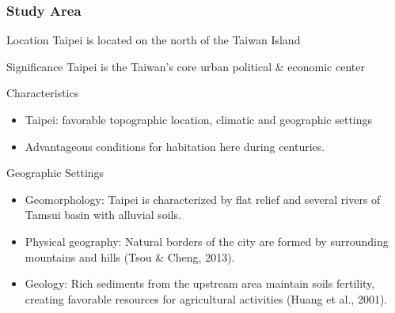 \documentclass[pdflatex,compress,8pt,
	xcolor={dvipsnames,dvipsnames,svgnames,x11names,table},
	hyperref={colorlinks = true,breaklinks = true, urlcolor = NavyBlue, breaklinks = true}]{beamer}
\begin{document}
\begin{frame}\frametitle{Study Area}
	\begin{alertblock}{Location}
Taipei is located on the north of the Taiwan Island
	\end{alertblock}
	
	\begin{block}{Significance}
Taipei is the Taiwan's core urban political \& economic center
	\end{block}

	\begin{block}{Characteristics}
		\begin{itemize}
			\item Taipei: favorable \alert{topographic} location, \alert{climatic} and \alert{geographic} settings 
			\item Advantageous conditions for habitation here during centuries.
		\end{itemize}
	\end{block}

	\begin{examples}{Geographic Settings}
		\begin{itemize}
			\item  Geomorphology: Taipei is characterized by flat relief and several rivers of Tamsui basin with alluvial soils. 
			\item Physical geography: Natural borders of the city are formed by surrounding mountains and hills	(Tsou \& Cheng, 2013).
			\item Geology: Rich sediments from the upstream area maintain soils fertility, creating favorable resources for agricultural activities (Huang et al., 2001).
		\end{itemize}
	\end{examples}
\end{frame}
\end{document}
